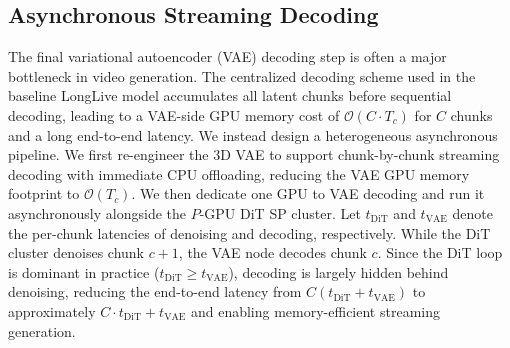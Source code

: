 \subsection{Asynchronous Streaming Decoding}
The final variational autoencoder (VAE) decoding step is often a major bottleneck in video generation. The centralized decoding scheme used in the baseline LongLive model accumulates all latent chunks before sequential decoding, leading to a VAE-side GPU memory cost of $\mathcal{O}(C \cdot T_c)$ for $C$ chunks and a long end-to-end latency.
We instead design a heterogeneous asynchronous pipeline. We first re-engineer the 3D VAE to support chunk-by-chunk streaming decoding with immediate CPU offloading, reducing the VAE GPU memory footprint to $\mathcal{O}(T_c)$. We then dedicate one GPU to VAE decoding and run it asynchronously alongside the $P$-GPU DiT SP cluster. Let $t_{\text{DiT}}$ and $t_{\text{VAE}}$ denote the per-chunk latencies of denoising and decoding, respectively. 
While the DiT cluster denoises chunk $c+1$, the VAE node decodes chunk $c$. Since the DiT loop is dominant in practice ($t_{\text{DiT}} \ge t_{\text{VAE}}$), decoding is largely hidden behind denoising, reducing the end-to-end latency from $C(t_{\text{DiT}} + t_{\text{VAE}})$ to approximately $C \cdot t_{\text{DiT}} + t_{\text{VAE}}$ and enabling memory-efficient streaming generation.
